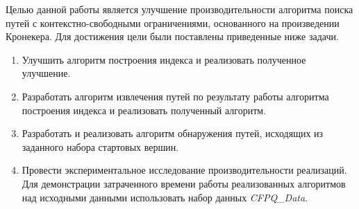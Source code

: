 Целью данной работы является улучшение производительности алгоритма поиска путей с контекстно-свободными ограничениями, основанного на произведении Кронекера. Для достижения цели были поставлены приведенные ниже задачи.

\begin{enumerate}
    \item Улучшить алгоритм построения индекса и реализовать полученное улучшение.
    \item Разработать алгоритм извлечения путей по результату работы алгоритма построения индекса и реализовать полученный алгоритм.
    \item Разработать и реализовать алгоритм обнаружения путей, исходящих из заданного набора стартовых вершин.
    \item Провести экспериментальное исследование производительности реализаций. Для демонстрации затраченного времени работы реализованных алгоритмов над исходными данными использовать набор данных \textit{CFPQ\_Data}.
\end{enumerate}
